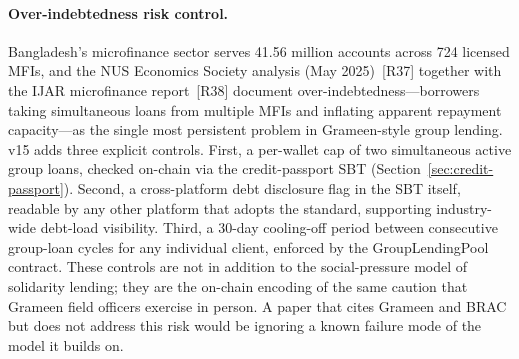 \documentclass[12pt,a4paper]{report}
\begin{document}
\paragraph{Over-indebtedness risk control.}
\label{sec:over-indebt}
Bangladesh's microfinance sector serves 41.56 million accounts across 724 licensed MFIs, and the NUS Economics Society analysis (May 2025)~[R37] together with the IJAR microfinance report~[R38] document over-indebtedness---borrowers taking simultaneous loans from multiple MFIs and inflating apparent repayment capacity---as the single most persistent problem in Grameen-style group lending. v15 adds three explicit controls. First, a per-wallet cap of two simultaneous active group loans, checked on-chain via the credit-passport SBT (Section~\ref{sec:credit-passport}). Second, a cross-platform debt disclosure flag in the SBT itself, readable by any other platform that adopts the standard, supporting industry-wide debt-load visibility. Third, a 30-day cooling-off period between consecutive group-loan cycles for any individual client, enforced by the GroupLendingPool contract. These controls are not in addition to the social-pressure model of solidarity lending; they are the on-chain encoding of the same caution that Grameen field officers exercise in person. A paper that cites Grameen and BRAC but does not address this risk would be ignoring a known failure mode of the model it builds on.
\end{document}
